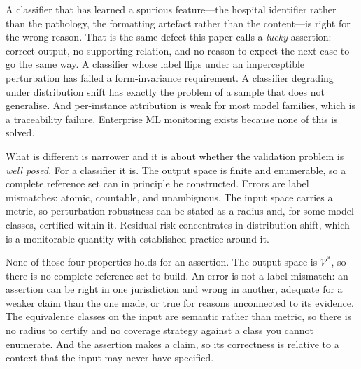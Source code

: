 A classifier that has learned a spurious feature---the hospital identifier rather
than the pathology, the formatting artefact rather than the content---is right for
the wrong reason. That is the same defect this paper calls a \emph{lucky} assertion:
correct output, no supporting relation, and no reason to expect the next case to go
the same way. A classifier whose label flips under an imperceptible perturbation has
failed a form-invariance requirement. A classifier degrading under distribution
shift has exactly the problem of a sample that does not generalise. And per-instance
attribution is weak for most model families, which is a traceability failure.
Enterprise ML monitoring exists because none of this is solved.

What is different is narrower and it is about whether the validation problem is
\emph{well posed}. For a classifier it is. The output space is finite and
enumerable, so a complete reference set can in principle be constructed. Errors are
label mismatches: atomic, countable, and unambiguous. The input space carries a
metric, so perturbation robustness can be stated as a radius and, for some model
classes, certified within it. Residual risk concentrates in distribution shift,
which is a monitorable quantity with established practice around it.

None of those four properties holds for an assertion. The output space is
$\mathcal{V}^{*}$, so there is no complete reference set to build. An error is not a
label mismatch: an assertion can be right in one jurisdiction and wrong in another,
adequate for a weaker claim than the one made, or true for reasons unconnected to
its evidence. The equivalence classes on the input are semantic rather than metric,
so there is no radius to certify and no coverage strategy against a class you cannot
enumerate. And the assertion makes a claim, so its correctness is relative to a
context that the input may never have specified.
